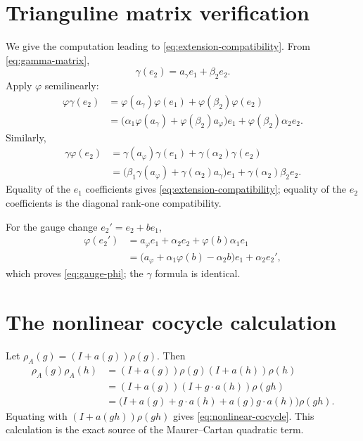 \documentclass[11pt]{article}
\theoremstyle{definition}
\begin{document}
\appendix

\section{Trianguline matrix verification}

We give the computation leading to \eqref{eq:extension-compatibility}.  From \eqref{eq:gamma-matrix},
\[
\gamma(e_2)=a_\gamma e_1+\beta_2e_2.
\]
Apply $\varphi$ semilinearly:
\begin{align*}
\varphi\gamma(e_2)
&=\varphi(a_\gamma)\varphi(e_1)+\varphi(\beta_2)\varphi(e_2)\\
&=\bigl(\alpha_1\varphi(a_\gamma)+\varphi(\beta_2)a_\varphi\bigr)e_1
+\varphi(\beta_2)\alpha_2e_2.
\end{align*}
Similarly,
\begin{align*}
\gamma\varphi(e_2)
&=\gamma(a_\varphi)\gamma(e_1)+\gamma(\alpha_2)\gamma(e_2)\\
&=\bigl(\beta_1\gamma(a_\varphi)+\gamma(\alpha_2)a_\gamma\bigr)e_1
+\gamma(\alpha_2)\beta_2e_2.
\end{align*}
Equality of the $e_1$ coefficients gives \eqref{eq:extension-compatibility}; equality of the $e_2$ coefficients is the diagonal rank-one compatibility.

For the gauge change $e_2'=e_2+be_1$,
\begin{align*}
\varphi(e_2')
&=a_\varphi e_1+\alpha_2e_2+\varphi(b)\alpha_1e_1\\
&=\bigl(a_\varphi+\alpha_1\varphi(b)-\alpha_2b\bigr)e_1+\alpha_2e_2',
\end{align*}
which proves \eqref{eq:gauge-phi}; the $\gamma$ formula is identical.

\section{The nonlinear cocycle calculation}

Let $\rho_A(g)=(I+a(g))\rho(g)$.  Then
\begin{align*}
\rho_A(g)\rho_A(h)
&=(I+a(g))\rho(g)(I+a(h))\rho(h)\\
&=(I+a(g))(I+g\cdot a(h))\rho(gh)\\
&=\bigl(I+a(g)+g\cdot a(h)+a(g)g\cdot a(h)\bigr)\rho(gh).
\end{align*}
Equating with $(I+a(gh))\rho(gh)$ gives \eqref{eq:nonlinear-cocycle}.  This calculation is the exact source of the Maurer--Cartan quadratic term.
\end{document}
